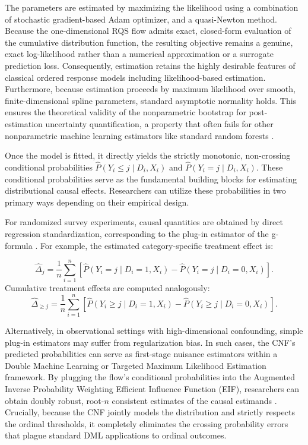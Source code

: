 \documentclass{article}
\begin{document}
The parameters are estimated by maximizing the likelihood using a combination of stochastic gradient-based Adam optimizer, and a quasi-Newton method. Because the one-dimensional RQS flow admits exact, closed-form evaluation of the cumulative distribution function, the resulting objective remains a genuine, exact log-likelihood rather than a numerical approximation or a surrogate prediction loss. Consequently, estimation retains the highly desirable features of classical ordered response models including likelihood-based estimation. Furthermore, because estimation proceeds by maximum likelihood over smooth, finite-dimensional spline parameters, standard asymptotic normality holds. This ensures the theoretical validity of the nonparametric bootstrap for post-estimation uncertainty quantification, a property that often fails for other nonparametric machine learning estimators like standard random forests \citep[see Appendix~\ref{app:estimation} for formal regularity conditions]{Bickel1981a}.

Once the model is fitted, it directly yields the strictly monotonic, non-crossing conditional probabilities $\widehat{P}(Y_i \le j \mid D_i, X_i)$ and $\widehat{P}(Y_i=j \mid D_i, X_i)$. These conditional probabilities serve as the fundamental building blocks for estimating distributional causal effects. Researchers can utilize these probabilities in two primary ways depending on their empirical design.

For randomized survey experiments, causal quantities are obtained by direct regression standardization, corresponding to the plug-in estimator of the g-formula \citep{Robins1986a}. For example, the estimated category-specific treatment effect is:

\[
\widehat{\Delta}_j = 
\frac{1}{n}
\sum_{i=1}^{n} \left[ \widehat{P}(Y_i=j\mid D_i=1,X_i) - \widehat{P}(Y_i=j\mid D_i=0,X_i) \right].
\]
Cumulative treatment effects are computed analogously:
\[
\widehat{\Delta}_{\ge j} = 
\frac{1}{n} \sum_{i=1}^{n} \left[ \widehat{P}(Y_i\ge j\mid D_i=1,X_i) - \widehat{P}(Y_i\ge j\mid D_i=0,X_i) \right].
\]

Alternatively, in observational settings with high-dimensional confounding, simple plug-in estimators may suffer from regularization bias. In such cases, the CNF's predicted probabilities can serve as first-stage nuisance estimators within a Double Machine Learning \citep[DML]{Chernozhukov2024a} or Targeted Maximum Likelihood Estimation \citep[TMLE]{Laan2006a} framework. By plugging the flow's conditional probabilities into the Augmented Inverse Probability Weighting \citep[AIPW]{Robins1994a} Efficient Influence Function (EIF), researchers can obtain doubly robust, root-$n$ consistent estimates of the causal estimands \citep{Chernozhukov2013b}. Crucially, because the CNF jointly models the distribution and strictly respects the ordinal thresholds, it completely eliminates the crossing probability errors that plague standard DML applications to ordinal outcomes. 
\end{document}
